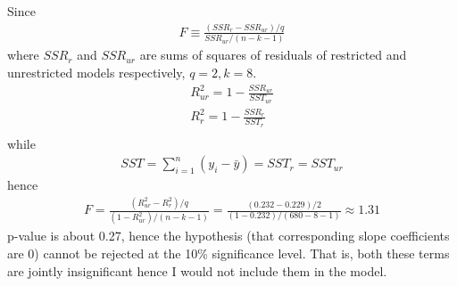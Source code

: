\documentclass[a4paper]{article}
\newcommand{\summa}{\sum_{i=1}^n}
\begin{document}
\begin{enumerate}[(i)]
	
	Since 
	\begin{align*}
	F \equiv \frac{(SSR_r - SSR_{ur}) / q}{SSR_{ur}/(n - k - 1)}
	\end{align*}
	where $SSR_r$ and $SSR_{ur}$ are sums of squares of residuals of restricted and unrestricted models respectively, $q = 2, k = 8$. 
	\begin{align*}
	R^2_{ur} = 1 - \frac{SSR_{ur}}{SST_{ur}}\\
	R^2_{r} = 1 - \frac{SSR_{r}}{SST_{r}}\\
	\end{align*}
	while
	\begin{align*}
	SST = \summa (y_i - \bar{y}) = SST_r = SST_{ur}
	\end{align*}
	hence
	\begin{align*}
	F = \frac{(R^2_{ur} - R^2_r)/q}{(1 - R^2_{ur})/(n-k-1)} = \frac{(0.232 - 0.229)/2}{(1-0.232)/(680 - 8 - 1)} \approx 1.31
	\end{align*}
	p-value is about 0.27, hence the hypothesis (that corresponding slope coefficients are 0) cannot be rejected at the 10\% significance level. That is, both these terms are jointly insignificant hence I would not include them in the model.
\end{enumerate}
\end{document}
